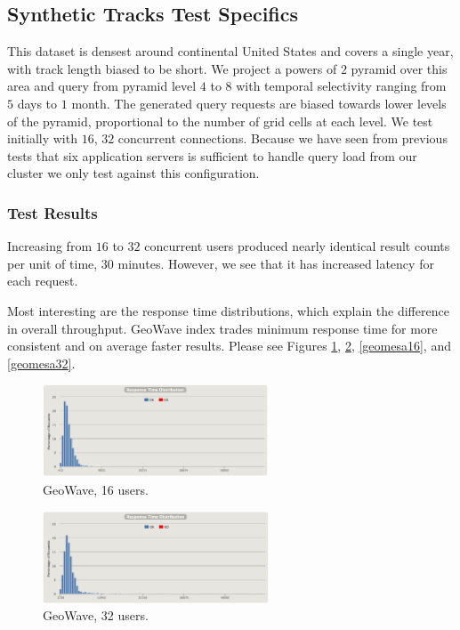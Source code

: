 \subsection{Synthetic Tracks Test Specifics}

This dataset is densest around continental United States and covers a single year, with track length biased to be short.
We project a powers of $2$ pyramid over this area and query from pyramid level $4$ to $8$ with temporal selectivity ranging from $5$ days to $1$ month.
The generated query requests are biased towards lower levels of the pyramid, proportional to the number of grid cells at each level.
We test initially with $16$, $32$ concurrent connections.
Because we have seen from previous tests that six application servers is sufficient to handle query load from our cluster we only test against this configuration.

\subsubsection{Test Results}

Increasing from $16$ to $32$ concurrent users produced nearly identical result counts per unit of time, $30$ minutes.
However, we see that it has increased latency for each request.

Most interesting are the response time distributions, which explain the difference in overall throughput.
GeoWave index trades minimum response time for more consistent and on average faster results.
Please see Figures \ref{geowave16}, \ref{geowave32}, \ref{geomesa16}, and \ref{geomesa32}.

\begin{figure}[h!tb]
  \centering
  \includegraphics[width=0.60\textwidth]{../docs/img/multitenancy/gw-16-responses.png}
  \caption{GeoWave, 16 users.}
  \label{geowave16}
\end{figure}

\begin{figure}[h!tb]
  \centering
  \includegraphics[width=0.60\textwidth]{../docs/img/multitenancy/gw-32-responses.png}
  \caption{GeoWave, 32 users.}
  \label{geowave32}
\end{figure}

